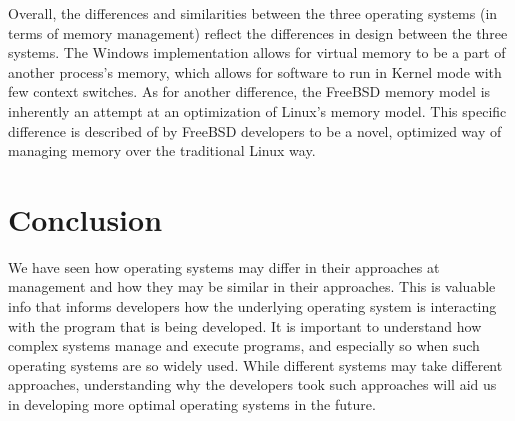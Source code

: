 \documentclass[journal, letterpaper, draftclsnofoot, onecolumn, 10pt]{IEEEtran}
\begin{document}
Overall, the differences and similarities between the three operating systems (in terms of memory management) reflect the differences in design between the three systems. The Windows implementation allows for virtual memory to be a part of another process's memory, which allows for software to run in Kernel mode with few context switches. As for another difference, the FreeBSD memory model is inherently an attempt at an optimization of Linux's memory model. This specific difference is described of by FreeBSD developers to be a novel, optimized way of managing memory over the traditional Linux way.

\section{Conclusion}

We have seen how operating systems may differ in their approaches at management and how they may be similar in their approaches. This is valuable info that informs developers how the underlying operating system is interacting with the program that is being developed. It is important to understand how complex systems manage and execute programs, and especially so when such operating systems are so widely used.
While different systems may take different approaches, understanding why the developers took such approaches will aid us in developing more optimal operating systems in the future.


\pagebreak


\end{document}
